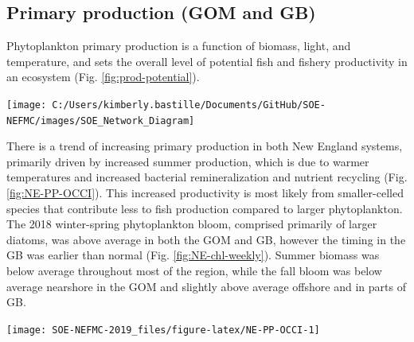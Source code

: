 \documentclass[10pt,]{article}
\let\origfigure\figure
\let\endorigfigure\endfigure
\renewenvironment{figure}[1][2] {
    \expandafter\origfigure\expandafter[H]
} {
    \endorigfigure
}
\begin{document}
\subsection{Primary production (GOM and
GB)}\label{primary-production-gom-and-gb}

Phytoplankton primary production is a function of biomass, light, and
temperature, and sets the overall level of potential fish and fishery
productivity in an ecosystem (Fig. \ref{fig:prod-potential}).

\begin{figure}

{\centering \texttt{[image: C:/Users/kimberly.bastille/Documents/GitHub/SOE-NEFMC/images/SOE\_Network\_Diagram]} 

}

\caption{Simplified representation of the pathways linking primary production and environmental driver throughout a fishery ecosystem. The important societal benefits that derive from sustainable fisheries depend directly on a sequence of events starting at the base of the food web. The production of fish and shellfish available for harvest by the fisheries follows pathways of energy flow from phytoplankton and zooplankton to different parts of the food web. The production at each component further depends on the effect of a host of environmental drivers including temperature, salinity, and other factors.}\label{fig:prod-potential}
\end{figure}

There is a trend of increasing primary production in both New England
systems, primarily driven by increased summer production, which is due
to warmer temperatures and increased bacterial remineralization and
nutrient recycling (Fig. \ref{fig:NE-PP-OCCI}). This increased
productivity is most likely from smaller-celled species that contribute
less to fish production compared to larger phytoplankton. The 2018
winter-spring phytoplankton bloom, comprised primarily of larger
diatoms, was above average in both the GOM and GB, however the timing in
the GB was earlier than normal (Fig. \ref{fig:NE-chl-weekly}). Summer
biomass was below average throughout most of the region, while the fall
bloom was below average nearshore in the GOM and slightly above average
offshore and in parts of GB.

\begin{figure}

{\centering \texttt{[image: SOE-NEFMC-2019\_files/figure-latex/NE-PP-OCCI-1]} 

}

\caption{Monthly primary production trends show the annual cycle (i.e. the peak during the summer months) and the changes over time for each month.}\label{fig:NE-PP-OCCI}
\end{figure}
\end{document}
